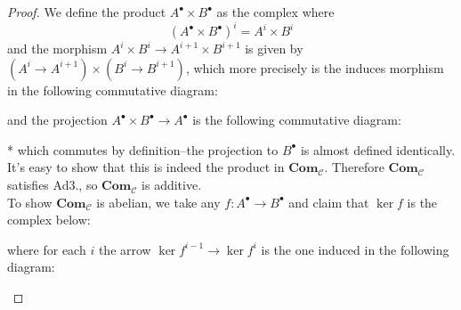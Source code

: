 \documentclass{article}
\newcommand{\fC}{\mathscr{C}}
\newcommand{\Com}{\mathbf{Com}} %
\begin{document}
\begin{proof}
    We define the product $A^\bullet \times B^\bullet$ as the complex where 
    \[
    (A^\bullet \times B^\bullet)^i=A^i\times B^i
    \]
    and the morphism $A^i\times B^i\rightarrow A^{i+1}\times B^{i+1}$ is given by $(A^i\rightarrow A^{i+1})\times(B^i\rightarrow B^{i+1})$, which more precisely is the induces morphism in the following commutative diagram:
    \begin{center}
    \end{center}
    and the projection $A^\bullet \times B^\bullet\rightarrow A^\bullet$ is the following commutative diagram:
    \begin{center}
    \end{center}*
    which commutes by definition--the projection to $B^\bullet$ is almost defined identically. It's easy to show that this is indeed the product in $\Com_\fC$. Therefore $\Com_\fC$ satisfies Ad3., so $\Com_\fC$ is additive.\\
    To show $\Com_\fC$ is abelian, we take any $f:A^\bullet \to B^\bullet$ and claim that $\ker f$ is the complex below:
    \begin{center}
    \end{center}
    where for each $i$ the arrow $\ker f^{i-1}\to \ker f^i$ is the one induced in the following diagram:
    \begin{center}
\end{center}
\end{proof}
\end{document}
